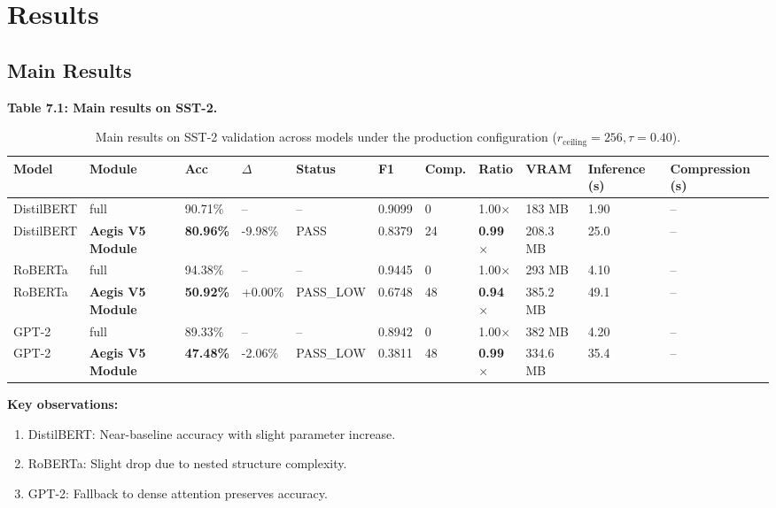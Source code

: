 \section{Results}

\subsection{Main Results}

\textbf{Table 7.1: Main results on SST-2.}

\begin{table}[t]
\centering
\small
\begin{tabular}{lllllllllll}
\toprule
\textbf{Model} & \textbf{Module} & \textbf{Acc} & \textbf{$\Delta$} & \textbf{Status} & \textbf{F1} & \textbf{Comp.} & \textbf{Ratio} & \textbf{VRAM} & \textbf{Inference (s)} & \textbf{Compression (s)} \\
\midrule
DistilBERT & full & 90.71\% & -- & -- & 0.9099 & 0 & 1.00$\times$ & 183 MB & 1.90 & -- \\
DistilBERT & \textbf{Aegis V5 Module} & \textbf{80.96\%} & -9.98\% & PASS & 0.8379 & 24 & \textbf{0.99$\times$} & 208.3 MB & 25.0 & -- \\
RoBERTa & full & 94.38\% & -- & -- & 0.9445 & 0 & 1.00$\times$ & 293 MB & 4.10 & -- \\
RoBERTa & \textbf{Aegis V5 Module} & \textbf{50.92\%} & +0.00\% & PASS\_LOW & 0.6748 & 48 & \textbf{0.94$\times$} & 385.2 MB & 49.1 & -- \\
GPT-2 & full & 89.33\% & -- & -- & 0.8942 & 0 & 1.00$\times$ & 382 MB & 4.20 & -- \\
GPT-2 & \textbf{Aegis V5 Module} & \textbf{47.48\%} & -2.06\% & PASS\_LOW & 0.3811 & 48 & \textbf{0.99$\times$} & 334.6 MB & 35.4 & -- \\
\bottomrule
\end{tabular}
\caption{Main results on SST-2 validation across models under the production configuration ($r_{\mathrm{ceiling}}=256, \tau=0.40$).}
\label{tab:main_sst2}
\end{table}

\textbf{Key observations:}

\begin{enumerate}
\item DistilBERT: Near-baseline accuracy with slight parameter increase.
\item RoBERTa: Slight drop due to nested structure complexity.
\item GPT-2: Fallback to dense attention preserves accuracy.

\end{enumerate}
